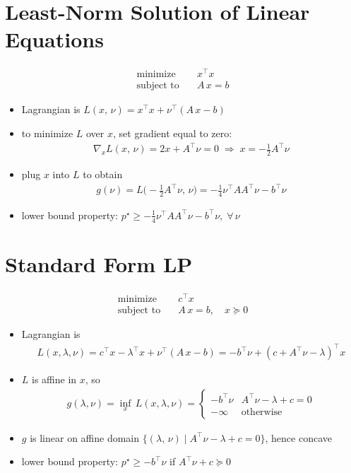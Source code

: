 \documentclass[11pt]{extarticle}
\newcommand{\ds}{\displaystyle}
\newcommand{\ie}{\;\Longrightarrow\;}
\theoremstyle{definition}
\begin{document}
\newpage

\section*{Least-Norm Solution of Linear Equations}
\begin{align*}
  \text{minimize}\quad & x^\top x \\
  \text{subject to}\quad & A\,x = b
\end{align*}
\begin{itemize}
  \item Lagrangian is $\ds L(x,\,\nu) = x^\top x + \nu^\top(A\,x - b)$
  \item to minimize $L$ over $x$, set gradient equal to zero:
    \begin{align*}
      \nabla_x L(x,\,\nu) = 2 x + A^\top\nu = 0\ie x = -\frac{1}{2}A^\top\nu
    \end{align*}
  \item plug $x$ into $L$ to obtain
    \begin{align*}
      g(\nu) = L\Big(-\frac{1}{2}A^\top\nu,\,\nu\Big) = -\frac{1}{4}\nu^\top AA^\top\nu - b^\top\nu
    \end{align*}
  \item lower bound property: $\ds p^\star\geqslant -\frac{1}{4}\nu^\top AA^\top\nu - b^\top\nu,\;\forall\,\nu$
\end{itemize}

\newpage

\section*{Standard Form LP}
\begin{align*}
  \text{minimize}\quad & c^\top x \\
  \text{subject to}\quad & A\,x = b, \quad x\succcurlyeq 0
\end{align*}
\begin{itemize}
  \item Lagrangian is 
    \begin{align*}
      \ds L(x,\lambda,\nu) = c^\top x - \lambda^\top x + \nu^\top(A\,x - b) = -b^\top\nu + (c + A^\top\nu - \lambda)^\top x
    \end{align*}
  \item $L$ is affine in $x$, so 
    \begin{align*}
      g(\lambda, \nu) = \inf_{x}\,L(x,\lambda,\nu) = \begin{cases}-b^\top\nu & A^\top\nu - \lambda + c = 0 \\ -\infty & \text{otherwise}\end{cases}
    \end{align*}
  \item $g$ is linear on affine domain $\ds\{(\lambda,\,\nu)\;|\;A^\top\nu - \lambda + c = 0\}$, hence concave
  \item lower bound property: $\ds p^\star\geqslant -b^\top\nu$ if $\ds A^\top\nu + c\succcurlyeq 0$
\end{itemize}
\end{document}
